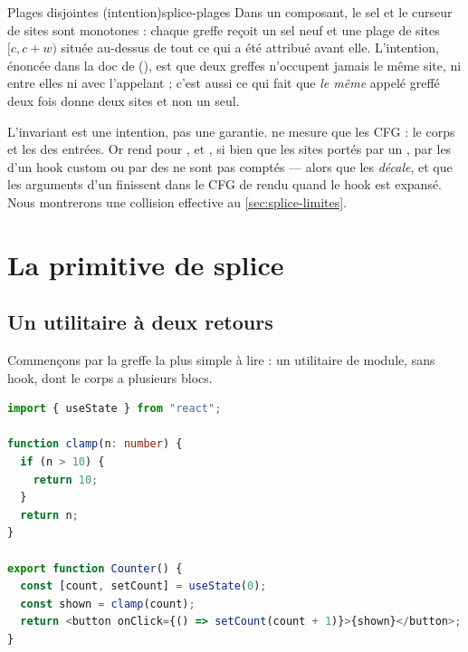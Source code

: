 \begin{invariant}{Plages disjointes (intention)}{splice-plages}
Dans un composant, le sel et le curseur de sites sont monotones : chaque greffe reçoit un sel neuf et une plage de sites $[c, c + w)$ située au-dessus de tout ce qui a été attribué avant elle. L'intention, énoncée dans la doc de  (), est que deux greffes n'occupent jamais le même site, ni entre elles ni avec l'appelant ; c'est aussi ce qui fait que \emph{le même} appelé greffé deux fois donne deux sites et non un seul.
\end{invariant}

\begin{piege}
L'invariant est une intention, pas une garantie.  ne mesure que les CFG : le corps et les  des entrées. Or  rend  pour ,  et , si bien que les sites portés par un , par les  d'un hook custom ou par des  ne sont pas comptés --- alors que  les \emph{décale}, et que les arguments d'un  finissent dans le CFG de rendu quand le hook est expansé. Nous montrerons une collision effective au \cref{sec:splice-limites}.
\end{piege}

\section{La primitive de splice}
\label{sec:splice-primitive}

\subsection{Un utilitaire à deux retours}

Commençons par la greffe la plus simple à lire : un utilitaire de module, sans hook, dont le corps a plusieurs blocs.

\begin{lstlisting}[language=TypeScript,caption={Un utilitaire à deux \code{return} (\file{/tmp/ch08/clamp/Counter.tsx})},label={lst:splice-clamp}]
import { useState } from "react";

function clamp(n: number) {
  if (n > 10) {
    return 10;
  }
  return n;
}

export function Counter() {
  const [count, setCount] = useState(0);
  const shown = clamp(count);
  return <button onClick={() => setCount(count + 1)}>{shown}</button>;
}
\end{lstlisting}

